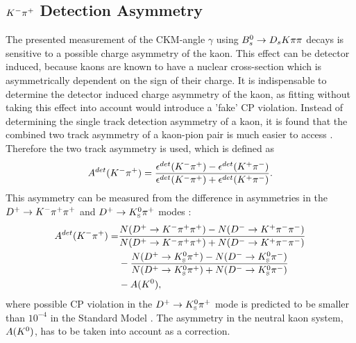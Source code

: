 

\clearpage
\subsection{${{K}^-}{{\pi}^+}$ Detection Asymmetry}
\label{sec:KpiAsym}

The presented measurement of the CKM-angle $\gamma$ using ${{B}^0_{s}}\rightarrow{\ensuremath{{D}_{s}}}{\ensuremath{K}}{\ensuremath{\pi}}{\ensuremath{\pi}}$ decays is sensitive to a possible charge asymmetry of the kaon. 
This effect can be detector induced, because kaons are known to have a nuclear cross-section which is asymmetrically dependent on the sign of their charge. 
It is indispensable to determine the detector induced charge asymmetry of the kaon, as fitting without taking this effect into account would introduce a 'fake' CP violation. 
Instead of determining the single track detection asymmetry of a kaon, it is found that the combined two track asymmetry of a kaon-pion pair is much easier to access \cite{Gordon:1482647} . 
Therefore the two track asymmetry is used, which is defined as 
\begin{equation}
A^{det}(\Km\pip) = \frac{\epsilon^{det}(\Km\pip) -\epsilon^{det}(\Kp\pim)}{\epsilon^{det}(\Km\pip) + \epsilon^{det}(\Kp\pim)}.
\label{eq:KpiDetAsymDef}
\end{equation}
This asymmetry can be measured from the difference in asymmetries in the ${{D}^+}\rightarrow{\ensuremath{{K}^-}}{\ensuremath{{\pi}^+}}{\ensuremath{{\pi}^+}}$ and ${{D}^+}\rightarrow{\ensuremath{{K}^0_{\mathrm{ \scriptscriptstyle S}}}}{\ensuremath{{\pi}^+}}$ modes
\cite{Davis:2310213}:
\begin{equation}
\begin{split}
A^{det}(\Km\pip) = & \frac{N(\Dp\to\Km\pip\pip) - N(\Dm\to\Kp\pim\pim)}{N(\Dp\to\Km\pip\pip) + N(\Dm\to\Kp\pim\pim)} \\
                  & - \frac{N(\Dp\to\KS\pip) - N(\Dm\to\KS\pim)}{N(\Dp\to\KS\pip) + N(\Dm\to\KS\pim)} \\
                  & - A(\Kz),
\end{split}
\label{eq:KpiDetAsymDef}
\end{equation}
where possible CP violation in the ${{D}^+}\rightarrow{\ensuremath{{K}^0_{\mathrm{ \scriptscriptstyle S}}}}{\ensuremath{{\pi}^+}}$ mode is predicted to be smaller than $10^{-4}$ in the Standard Model \cite{Bigi:1994aw}.
The asymmetry in the neutral kaon system, $A({{K}^0})$, has to be taken into account as a correction. 


